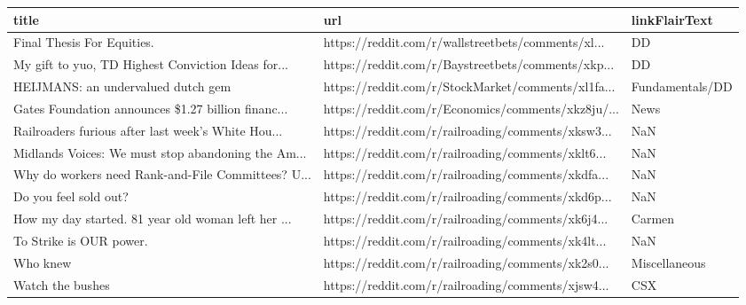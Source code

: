 \documentclass{book}
\begin{document}
  
  \begin{table}[htbp]%
  \centering%
  \begin{adjustbox}{width=1\textwidth}%
  \begin{tabular}{lll}
  \toprule
                                               title &                                                url &   linkFlairText \\
  \midrule
                          Final Thesis For Equities. & https://reddit.com/r/wallstreetbets/comments/xl... &              DD \\
  My gift to yuo, TD Highest Conviction Ideas for... & https://reddit.com/r/Baystreetbets/comments/xkp... &              DD \\
                  HEIJMANS: an undervalued dutch gem & https://reddit.com/r/StockMarket/comments/xl1fa... & Fundamentals/DD \\
  Gates Foundation announces \$1.27 billion financ... & https://reddit.com/r/Economics/comments/xkz8ju/... &            News \\
  Railroaders furious after last week’s White Hou... & https://reddit.com/r/railroading/comments/xksw3... &             NaN \\
  Midlands Voices: We must stop abandoning the Am... & https://reddit.com/r/railroading/comments/xklt6... &             NaN \\
  Why do workers need Rank-and-File Committees? U... & https://reddit.com/r/railroading/comments/xkdfa... &             NaN \\
                               Do you feel sold out? & https://reddit.com/r/railroading/comments/xkd6p... &             NaN \\
  How my day started. 81 year old woman left her ... & https://reddit.com/r/railroading/comments/xk6j4... &          Carmen \\
                             To Strike is OUR power. & https://reddit.com/r/railroading/comments/xk4lt... &             NaN \\
                                            Who knew & https://reddit.com/r/railroading/comments/xk2s0... &   Miscellaneous \\
                                    Watch the bushes & https://reddit.com/r/railroading/comments/xjsw4... &             CSX \\
  \bottomrule
  \end{tabular}
  \end{adjustbox}%
  \end{table}
  
\end{document}
